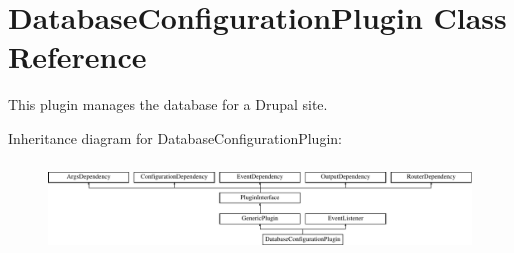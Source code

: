 \hypertarget{classDatabaseConfigurationPlugin}{\section{Database\-Configuration\-Plugin Class Reference}
\label{classDatabaseConfigurationPlugin}
}


This plugin manages the database for a Drupal site.  


Inheritance diagram for Database\-Configuration\-Plugin\-:\begin{figure}[H]
\begin{center}
\leavevmode
\includegraphics[height=2.434783cm]{classDatabaseConfigurationPlugin}
\end{center}
\end{figure}

